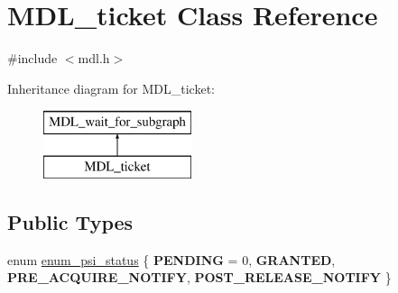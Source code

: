 \hypertarget{classMDL__ticket}{}\section{M\+D\+L\+\_\+ticket Class Reference}
\label{classMDL__ticket}


{\ttfamily \#include $<$mdl.\+h$>$}

Inheritance diagram for M\+D\+L\+\_\+ticket\+:\begin{figure}[H]
\begin{center}
\leavevmode
\includegraphics[height=2.000000cm]{classMDL__ticket}
\end{center}
\end{figure}
\subsection*{Public Types}
\begin{DoxyCompactItemize}
\item 
enum \mbox{\hyperlink{classMDL__ticket_aac8808e99159aafeabd6ed1bde13894f}{enum\+\_\+psi\+\_\+status}} \{ {\bfseries P\+E\+N\+D\+I\+NG} = 0, 
{\bfseries G\+R\+A\+N\+T\+ED}, 
{\bfseries P\+R\+E\+\_\+\+A\+C\+Q\+U\+I\+R\+E\+\_\+\+N\+O\+T\+I\+FY}, 
{\bfseries P\+O\+S\+T\+\_\+\+R\+E\+L\+E\+A\+S\+E\+\_\+\+N\+O\+T\+I\+FY}
 \}
\end{DoxyCompactItemize}
